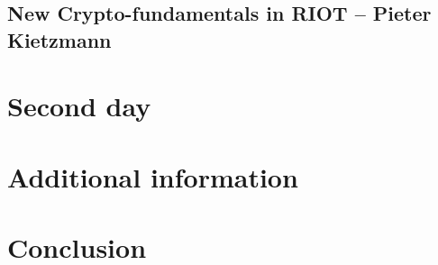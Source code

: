 \documentclass[journal, a4paper]{../IEEEtran}
\begin{document}

\subsection{New Crypto-fundamentals in RIOT -- Pieter Kietzmann}


\section{Second day}


\section{Additional information}



\section{Conclusion}
\end{document}
